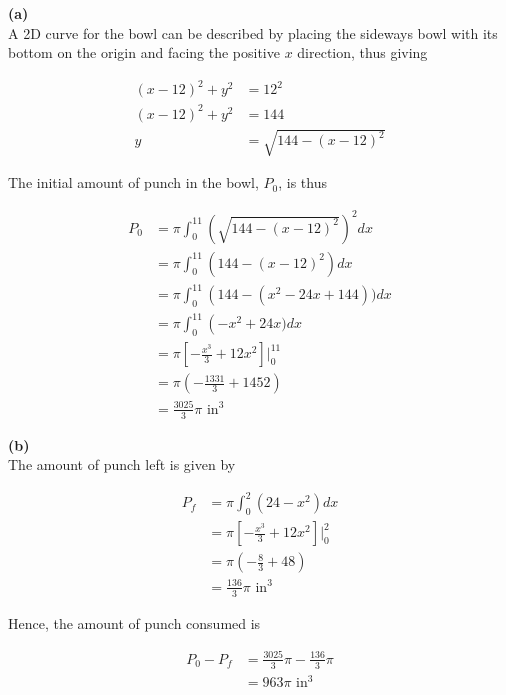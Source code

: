 \documentclass{article}
\begin{document}
    \textbf{(a)} \\
    A 2D curve for the bowl can be described by placing the sideways bowl with its bottom on the origin and facing the positive $x$ direction, thus giving

    \begin{align*}
        (x-12)^2 + y^2 &= 12^2 \\
        (x-12)^2 + y^2 &= 144 \\
        y              &= \sqrt{144-(x-12)^2}
    \end{align*}

    The initial amount of punch in the bowl, $P_0$, is thus

    \begin{align*}
        P_0 &= \pi \int_0^{11} \left(\sqrt{144-(x-12)^2}\right)^2 dx \\
            &= \pi \int_0^{11} \left(144-(x-12)^2\right)dx \\
            &= \pi \int_0^{11} \left(144-(x^2-24x+144))dx \\
            &= \pi \int_0^{11} \left(-x^2+24x)dx \\
            &= \pi\left[-\frac{x^3}{3}+12x^2\right]\Big|_0^{11} \\
            &= \pi\left(-\frac{1331}{3}+1452\right) \\
            &= \frac{3025}{3}\pi \text{ in}^3
    \end{align*}

    \pagebreak
    \thispagestyle{9}

    \textbf{(b)} \\
    The amount of punch left is given by

    \begin{align*}
        P_f &= \pi \int_0^2 (24-x^2)dx \\
            &= \pi\left[-\frac{x^3}{3}+12x^2\right]\Big|_0^2 \\
            &= \pi\left(-\frac{8}{3}+48\right) \\
            &= \frac{136}{3}\pi \text{ in}^3
    \end{align*}

    Hence, the amount of punch consumed is

    \begin{align*}
        P_0 - P_f   &= \frac{3025}{3}\pi - \frac{136}{3}\pi \\
                    &= 963\pi \text{ in}^3
    \end{align*}
\end{document}
